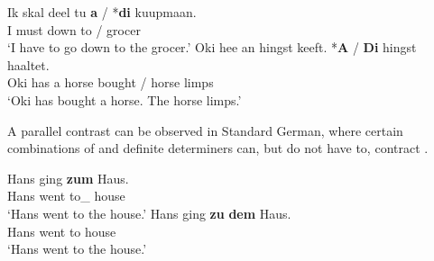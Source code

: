 \documentclass[output=paper
,modfonts
,nonflat]{langscibook}
\begin{document}
\begin{exe}
\ex\label{ex:schwarz:3}
\begin{xlist}
  \ex \gll Ik skal deel tu \textbf{a} \textnormal{/} \textnormal{*}\textbf{di} kuupmaan.\\
           I  must down to {\theweak} / {\phantom{*}}{\thestrong} grocer\\
      \glt `I have to go down to the grocer.'
  \ex \gll Oki hee an hingst keeft. \textnormal{*}\textbf{A} \textnormal{/} \textbf{Di} hingst haaltet.\\
           Oki has a horse bought {\phantom{*}}{\theweak} / {\thestrong} horse limps\\
      \glt `Oki has bought a horse. The horse limps.' 
\end{xlist}
\end{exe}


A parallel contrast can be observed in Standard German, where certain
combinations of  and definite determiners can, but do not
have to, contract \citep[see, a.o.][]{Hartmann1978,Haberland1985,Cieschinger2006}.


\begin{exe}
\ex\label{ex:schwarz:4}
\begin{xlist}
\ex \gll Hans ging \textbf{zum} Haus.\\
        Hans went {to\_\theweak} house\\
    \glt `Hans went to the house.'
\ex \gll Hans ging \textbf{zu} \textbf{dem} Haus.\\
        Hans went to {\thestrong} house\\
    \glt `Hans went to the house.' 
\end{xlist}
\end{exe}
\end{document}

